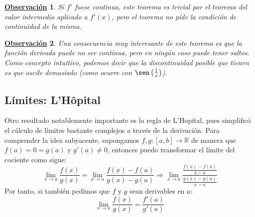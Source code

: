 \documentclass[10pt,a4paper,openright]{book}
\theoremstyle{break}
\newtheorem{obs}{\underline{Observación}}[chapter]
\begin{document}
\begin{obs}
Si $f'$ fuese continua, este teorema es trivial por el teorema del valor intermedio aplicado a $f'(x)$, pero el teorema no pide la condición de continuidad de la misma.
\end{obs}

\begin{obs}
Una consecuencia muy interesante de este teorema es que la función derivada puede no ser continua, pero en ningún caso puede tener saltos. Como concepto intuitivo, podemos decir que la discontinuidad posible que tienen es que oscile demasiado (como ocurre con $\sen\left(\frac{1}{x}\right)$).
\begin{center}
\end{center}
\end{obs}

\subsection{Límites: L'Hôpital}
Otro resultado notablemente importante es la regla de L'Hopital, pues simplificó el cálculo de límites bastante complejos a través de la derivación. Para comprender la idea subyacente, supongamos $f,g: [a,b]\rightarrow \mathbb R$ de manera que $f(a)=0=g(a)$ y $g'(a)\neq 0$, entonces puedo transformar el límite del cociente como sigue:
$$\lim_{x\rightarrow a} \frac{f(x)}{g(x)}=\lim_{x\rightarrow a} \frac{f(x)-f(a)}{g(x)-g(a)}\Rightarrow \lim_{x\rightarrow a}\frac{\frac{f(x)-f(a)}{x-a}}{\frac{g(x)-g(a)}{x-a}}$$
Por tanto, si también pedimos que $f$ y $g$ sean derivables en $a$:
$$\lim_{x\rightarrow a} \frac{f(x)}{g(x)}= \frac{f'(a)}{g'(a)}$$
\end{document}
